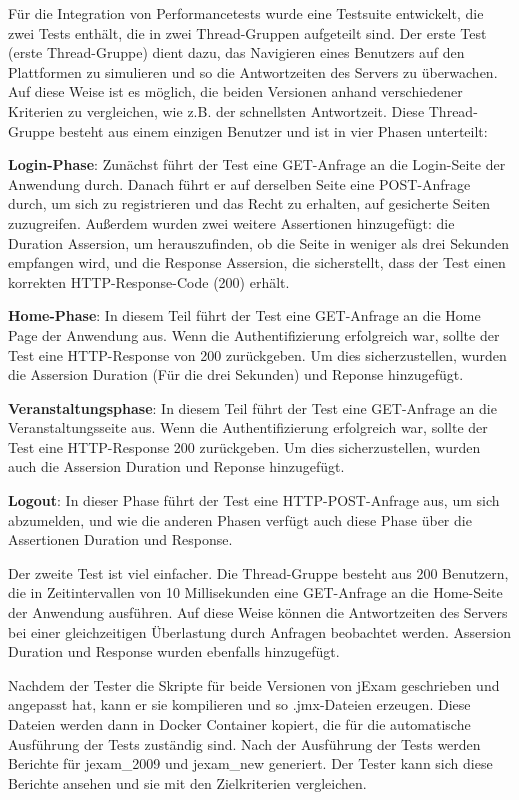 Für die Integration von Performancetests wurde eine Testsuite entwickelt,
die zwei Tests enthält, die in zwei Thread-Gruppen aufgeteilt sind. Der erste
Test (erste Thread-Gruppe) dient dazu, das Navigieren eines Benutzers auf den
Plattformen zu simulieren und so die Antwortzeiten des Servers zu überwachen.
Auf diese Weise ist es möglich, die beiden Versionen anhand verschiedener
Kriterien zu vergleichen, wie z.B. der schnellsten Antwortzeit. Diese
Thread-Gruppe besteht aus einem einzigen Benutzer und ist in vier Phasen
unterteilt:


\textbf{Login-Phase}: Zunächst führt der Test eine GET-Anfrage an die Login-Seite der
Anwendung durch. Danach führt er auf derselben Seite eine POST-Anfrage durch,
um sich zu registrieren und das Recht zu erhalten, auf gesicherte Seiten
zuzugreifen. Außerdem wurden zwei weitere Assertionen hinzugefügt: die
Duration Assersion, um herauszufinden, ob die Seite in weniger als drei
Sekunden empfangen wird, und die Response Assersion, die sicherstellt,
dass der Test einen korrekten HTTP-Response-Code (200) erhält.


\textbf{Home-Phase}: In diesem Teil führt der Test eine GET-Anfrage an die Home Page
der Anwendung aus. Wenn die Authentifizierung erfolgreich war, sollte der
Test eine HTTP-Response von 200 zurückgeben. Um dies sicherzustellen, wurden
die Assersion Duration (Für die drei Sekunden) und Reponse hinzugefügt.


\textbf{Veranstaltungsphase}: In diesem Teil führt der Test eine GET-Anfrage an die
Veranstaltungsseite aus. Wenn die Authentifizierung erfolgreich war, sollte
der Test eine HTTP-Response 200 zurückgeben. Um dies sicherzustellen, wurden
auch die Assersion Duration und Reponse hinzugefügt.

\textbf{Logout}: In dieser Phase führt der Test eine HTTP-POST-Anfrage aus, um sich
abzumelden, und wie die anderen Phasen verfügt auch diese Phase über die
Assertionen Duration und Response.



Der zweite Test ist viel einfacher. Die Thread-Gruppe besteht aus 200
Benutzern, die in Zeitintervallen von 10 Millisekunden eine GET-Anfrage
an die Home-Seite der Anwendung ausführen. Auf diese Weise können die
Antwortzeiten des Servers bei einer gleichzeitigen Überlastung durch
Anfragen beobachtet werden. Assersion Duration und Response wurden ebenfalls
hinzugefügt.


Nachdem der Tester die Skripte für beide Versionen von jExam geschrieben
und angepasst hat, kann er sie kompilieren und so .jmx-Dateien erzeugen.
Diese Dateien werden dann in Docker Container kopiert, die für die
automatische Ausführung der Tests zuständig sind. Nach der Ausführung der
Tests werden Berichte für \gls{jexam_2009} und \gls{jexam_new} generiert. Der Tester
kann sich diese Berichte ansehen und sie mit den Zielkriterien vergleichen.

